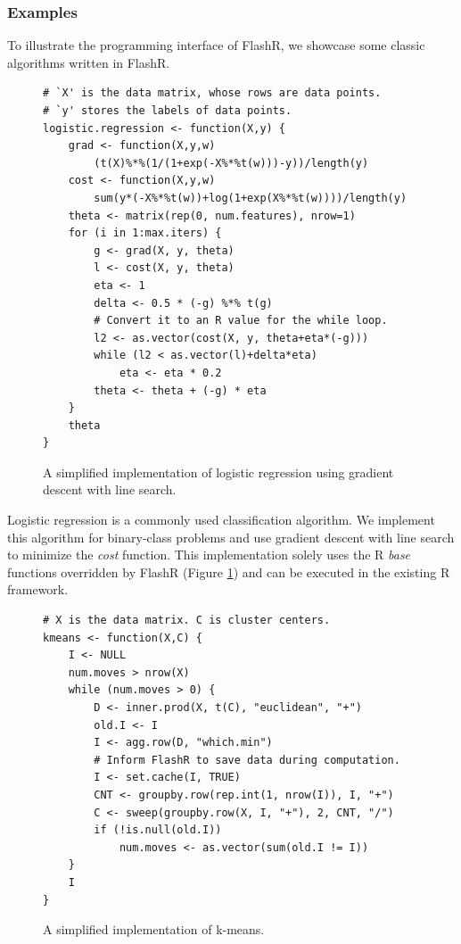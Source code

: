 \subsubsection{Examples} \label{sec:apps}
To illustrate the programming interface of FlashR, we showcase some classic
algorithms written in FlashR.

\begin{figure}
\begin{verbatim}
# `X' is the data matrix, whose rows are data points.
# `y' stores the labels of data points.
logistic.regression <- function(X,y) {
	grad <- function(X,y,w)
		(t(X)%*%(1/(1+exp(-X%*%t(w)))-y))/length(y)
	cost <- function(X,y,w)
		sum(y*(-X%*%t(w))+log(1+exp(X%*%t(w))))/length(y)
	theta <- matrix(rep(0, num.features), nrow=1)
	for (i in 1:max.iters) {
		g <- grad(X, y, theta)
		l <- cost(X, y, theta)
		eta <- 1
		delta <- 0.5 * (-g) %*% t(g)
		# Convert it to an R value for the while loop.
		l2 <- as.vector(cost(X, y, theta+eta*(-g)))
		while (l2 < as.vector(l)+delta*eta)
			eta <- eta * 0.2
		theta <- theta + (-g) * eta
	}
	theta
}
\end{verbatim}
\vspace{-10pt}
\caption{A simplified implementation of logistic regression using
  gradient descent with line search.}
\label{logistic}
\vspace{-5pt}
\end{figure}

Logistic regression is a commonly used classification algorithm. We implement
this algorithm for binary-class problems and use gradient descent with
line search to minimize the \textit{cost} function. This implementation
solely uses the R \textit{base} functions overridden by FlashR (Figure
\ref{logistic}) and can be executed in the existing R framework.

\begin{figure}
\centering
\begin{verbatim}
# X is the data matrix. C is cluster centers.
kmeans <- function(X,C) {
	I <- NULL
	num.moves > nrow(X)
	while (num.moves > 0) {
		D <- inner.prod(X, t(C), "euclidean", "+")
		old.I <- I
		I <- agg.row(D, "which.min")
		# Inform FlashR to save data during computation.
		I <- set.cache(I, TRUE)
		CNT <- groupby.row(rep.int(1, nrow(I)), I, "+")
		C <- sweep(groupby.row(X, I, "+"), 2, CNT, "/")
		if (!is.null(old.I))
			num.moves <- as.vector(sum(old.I != I))
	}
	I
}
\end{verbatim}
\vspace{-10pt}
	\caption{A simplified implementation of k-means.}
	\label{fig:kmeans}
\vspace{-10pt}
\end{figure}

